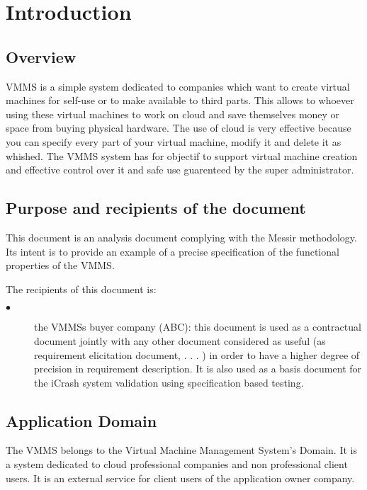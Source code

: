 
\chapter{Introduction}
\label{chap:introduction}

\section{Overview}

VMMS is a simple system dedicated to companies which want to create virtual
machines for self-use or to make available to third parts. This allows to
whoever using these virtual machines to work on cloud and save themselves money
or space from buying physical hardware. The use of cloud is very effective
because you can specify every part of your virtual machine, modify it and delete
it as whished. The VMMS system has for objectif to support virtual machine
creation and effective control over it and safe use guarenteed by the super
administrator.

\section{Purpose and recipients of the document}

This document is an analysis document complying with the Messir methodology. Its intent is
to provide an example of a precise specification of the functional properties of
the VMMS.

The recipients of this document is:
\begin{description}
\item[$\bullet$] the VMMSs buyer company (ABC): this document is used as a
contractual document jointly with any other document considered as useful (as requirement elicitation document, . . . )
in order to have a higher degree of precision in requirement description. It is also used as a basis
document for the iCrash system validation using specification based testing.
\end{description}

\section{Application Domain}

The VMMS belongs to the Virtual Machine Management System's Domain. It is a
system dedicated to cloud professional companies and non professional client
users. It is an external service for client users of the application owner
company.

